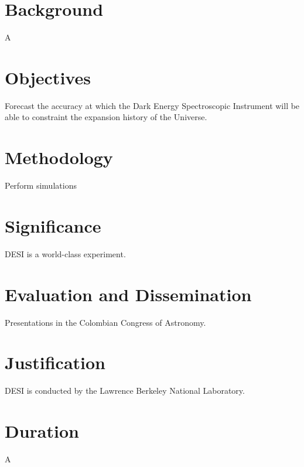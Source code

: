 \documentclass[12pt]{article}
\begin{document}
\section*{Background}
A
\section*{Objectives}
Forecast the accuracy at which the Dark Energy Spectroscopic
Instrument will be able to constraint the expansion history of the
Universe. 

\section*{Methodology}
Perform simulations 

\section*{Significance}

DESI is a world-class experiment.

\section*{Evaluation and Dissemination}

Presentations in the Colombian Congress of Astronomy. 


\section*{Justification}
DESI is conducted by the Lawrence Berkeley National Laboratory.

\section*{Duration}
A
\end{document}
